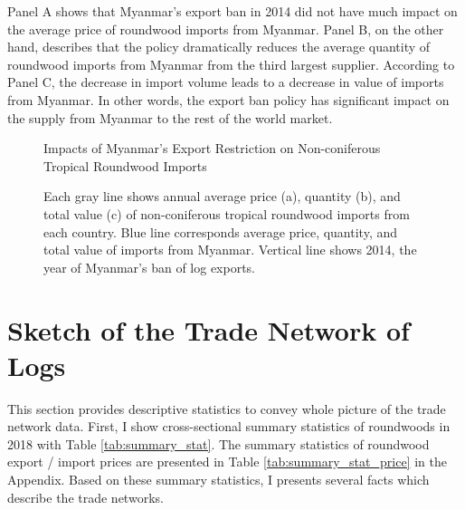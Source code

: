 \documentclass[a4paper,12pt]{article}
\begin{document}
Panel A shows that Myanmar's export ban in 2014 did not have much impact on the average price of roundwood imports from Myanmar. Panel B, on the other hand, describes that the policy dramatically reduces the average quantity of roundwood imports from Myanmar from the third largest supplier. According to Panel C, the decrease in import volume leads to a decrease in value of imports from Myanmar. In other words, the export ban policy has significant impact on the supply from Myanmar to the rest of the world market. 

\begin{figure}[H] 
    \centering
    \caption{Impacts of Myanmar's Export Restriction on Non-coniferous Tropical Roundwood Imports}
    \caption*{\small{Each gray line shows annual average price (a), quantity (b), and total value (c) of non-coniferous tropical roundwood imports from each country. Blue line corresponds average price, quantity, and total value of imports from Myanmar. Vertical line shows 2014, the year of Myanmar's ban of log exports.}}
    \label{fig:shock_Myanmar}
\end{figure}

\section{Sketch of the Trade Network of Logs}
This section provides descriptive statistics to convey whole picture of the trade network data. First, I show cross-sectional summary statistics of roundwoods in 2018 with Table \ref{tab:summary_stat}. The summary statistics of roundwood export / import prices are presented in Table \ref{tab:summary_stat_price} in the Appendix. Based on these summary statistics, I presents several facts which describe the trade networks.\\
\end{document}
